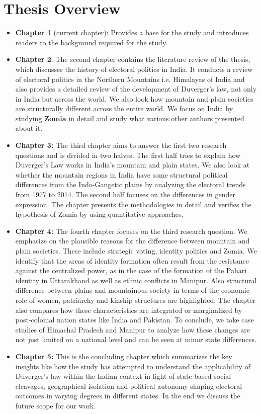 \begin{sloppypar}
\section{Thesis Overview}

\begin{itemize}
    \item \textbf{Chapter 1} (current chapter): Provides a base for the study and introduces readers to the background required for the study.
    \item \textbf{Chapter 2}: The second chapter contains the literature review of the thesis, which discusses the history of electoral politics in India. It conducts a review of electoral politics in the Northern Mountains i.e. Himalayas of India and also provides a detailed review of the development of Duverger's law, not only in India but across the world.  We also look how mountain and plain societies are structurally different across the entire world. We focus on India by studying \textbf{Zomia} in detail and study what various other authors presented about it.
    \item \textbf{Chapter 3:} The third chapter aims to answer the first two research questions and is divided in two halves. The first half tries to explain how Duverger's Law works in India's mountain and plain states. We also look at whether the mountain regions in India have some structural political differences from the Indo-Gangetic plains by analyzing the electoral trends from 1977 to 2014. The second half focuses on the differences in gender expression. The chapter presents the methodologies in detail and verifies the hypothesis of Zomia by using quantitative approaches.
    \item \textbf{Chapter 4:} The fourth chapter focuses on the third research question. We emphasize on the plausible reasons for the difference between mountain and plain societies. These include  strategic voting, identity politics and Zomia. We identify that the areas of identity formation often result from the resistance against the centralized power, as in the case of the formation of the Pahari identity in Uttarakhand as well as ethnic conflicts in Manipur. Also structural difference between plains and mountainous society in terms of the economic role of women, patriarchy and kinship structures are highlighted. The chapter also compares how these characteristics are integrated or marginalized by post-colonial nation states like India and Pakistan. To conclude, we take case studies of Himachal Pradesh and Manipur to analyze how these changes are not just limited on a national level and can be seen at minor state differences.
    \item \textbf{Chapter 5:} This is the concluding chapter which summarizes the key insights like how the study  has attempted to understand the applicability of Duverger's law within the Indian context in light of state based social cleavages, geographical isolation and political autonomy shaping electoral outcomes in varying degrees in different states. In the end we discuss the future scope for our work.
\end{itemize}

\end{sloppypar}